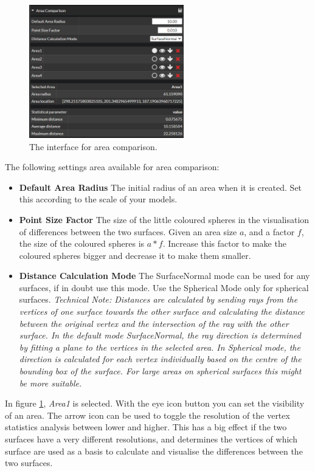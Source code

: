 \begin{figure}[h]
	\centering
	\includegraphics[width=0.6\textwidth]{pics/surfaceComparisonAreaGui.PNG}
	\caption[The interface for area comparison.]{The interface for area comparison.}
	\label{fig:surfaceComparisonAreaGui}
\end{figure}

The following settings area available for area comparison:

\begin{itemize}
	\item \textbf{Default Area Radius} The initial radius of an area when it is created. Set this according to the scale of your models.
	\item \textbf{Point Size Factor} The size of the little coloured spheres in the visualisation of differences between the two surfaces. Given an area size $a$, and a factor $f$, the size of the coloured spheres is $a * f$. Increase this factor to make the coloured spheres bigger and decrease it to make them smaller.
	\item \textbf{Distance Calculation Mode} The SurfaceNormal mode can be used for any surfaces, if in doubt use this mode. Use the Spherical Mode only for spherical surfaces. \emph{Technical Note: Distances are calculated by sending rays from the vertices of one surface towards the other surface and calculating the distance between the original vertex and the intersection of the ray with the other surface. In the default mode \emph{SurfaceNormal}, the ray direction is determined by fitting a plane to the vertices in the selected area. In Spherical mode, the direction is calculated for each vertex individually based on the centre of the bounding box of the surface. For large areas on spherical surfaces this might be more suitable.}
\end{itemize}


In figure \ref{fig:surfaceComparisonAreaGui}, \emph{Area1} is selected. With the eye icon button you can set the visibility of an area. The arrow icon can be used to toggle the resolution of the vertex statistics analysis between lower and higher. This has a big effect if the two surfaces have a very different resolutions, and determines the vertices of which surface are used as a basis to calculate and visualise the differences between the two surfaces.

